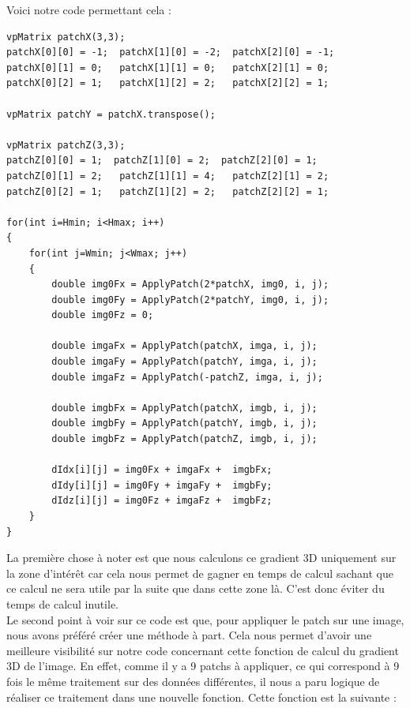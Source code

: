 \documentclass[a4paper,11pt]{article}
\begin{document}
Voici notre code permettant cela :
\begin{verbatim}
vpMatrix patchX(3,3);
patchX[0][0] = -1;  patchX[1][0] = -2;  patchX[2][0] = -1;
patchX[0][1] = 0;   patchX[1][1] = 0;   patchX[2][1] = 0;
patchX[0][2] = 1;   patchX[1][2] = 2;   patchX[2][2] = 1;

vpMatrix patchY = patchX.transpose();

vpMatrix patchZ(3,3);
patchZ[0][0] = 1;  patchZ[1][0] = 2;  patchZ[2][0] = 1;
patchZ[0][1] = 2;   patchZ[1][1] = 4;   patchZ[2][1] = 2;
patchZ[0][2] = 1;   patchZ[1][2] = 2;   patchZ[2][2] = 1;

for(int i=Hmin; i<Hmax; i++) 
{
    for(int j=Wmin; j<Wmax; j++) 
    {
        double img0Fx = ApplyPatch(2*patchX, img0, i, j);
        double img0Fy = ApplyPatch(2*patchY, img0, i, j);
        double img0Fz = 0;

        double imgaFx = ApplyPatch(patchX, imga, i, j);
        double imgaFy = ApplyPatch(patchY, imga, i, j);
        double imgaFz = ApplyPatch(-patchZ, imga, i, j);
	
        double imgbFx = ApplyPatch(patchX, imgb, i, j);
        double imgbFy = ApplyPatch(patchY, imgb, i, j);
        double imgbFz = ApplyPatch(patchZ, imgb, i, j);

        dIdx[i][j] = img0Fx + imgaFx +  imgbFx;
        dIdy[i][j] = img0Fy + imgaFy +  imgbFy;
        dIdz[i][j] = img0Fz + imgaFz +  imgbFz;
    }
}
\end{verbatim}

La premi\`ere chose \`a noter est que nous calculons ce gradient 3D uniquement sur la zone d'int\'er\^et car cela nous permet de gagner en temps de calcul sachant que ce calcul ne sera utile par la suite que dans cette zone l\`a. C'est donc \'eviter du temps de calcul inutile.\\

Le second point \`a voir sur ce code est que, pour appliquer le patch sur une image, nous avons pr\'ef\'er\'e cr\'eer une m\'ethode \`a part. Cela nous permet d'avoir une meilleure visibilit\'e sur notre code concernant cette fonction de calcul du gradient 3D de l'image. En effet, comme il y a 9 patchs \`a appliquer, ce qui correspond \`a 9 fois le m\^eme traitement sur des donn\'ees diff\'erentes, il nous a paru logique de r\'ealiser ce traitement dans une nouvelle fonction. Cette fonction est la suivante :
\end{document}
